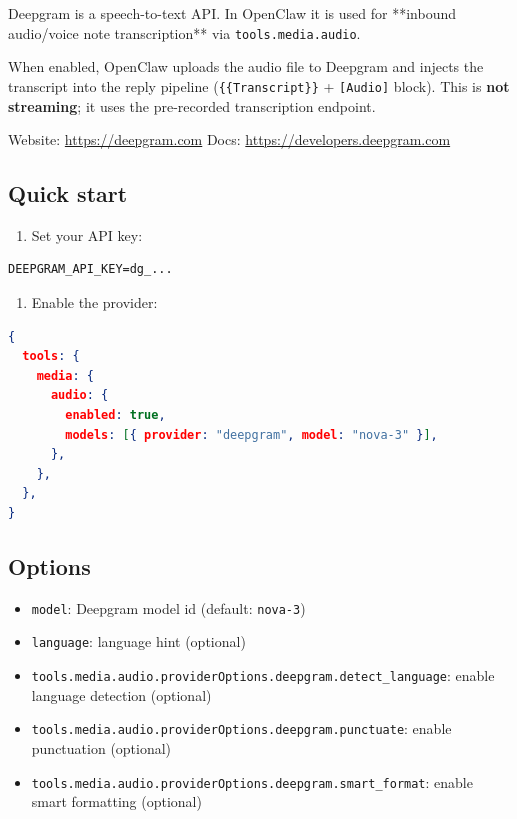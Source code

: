 Deepgram is a speech-to-text API. In OpenClaw it is used for **inbound audio/voice note
transcription** via \texttt{tools.media.audio}.

When enabled, OpenClaw uploads the audio file to Deepgram and injects the transcript
into the reply pipeline (\texttt{\{\{Transcript\}\}} + \texttt{[Audio]} block). This is \textbf{not streaming};
it uses the pre-recorded transcription endpoint.

Website: \href{https://deepgram.com}{https://deepgram.com}
Docs: \href{https://developers.deepgram.com}{https://developers.deepgram.com}

\subsection{Quick start}


\begin{enumerate}
  \item Set your API key:
\end{enumerate}


\begin{lstlisting}
DEEPGRAM_API_KEY=dg_...
\end{lstlisting}


\begin{enumerate}
  \item Enable the provider:
\end{enumerate}


\begin{lstlisting}[language=json]
{
  tools: {
    media: {
      audio: {
        enabled: true,
        models: [{ provider: "deepgram", model: "nova-3" }],
      },
    },
  },
}
\end{lstlisting}


\subsection{Options}


\begin{itemize}
  \item \texttt{model}: Deepgram model id (default: \texttt{nova-3})
  \item \texttt{language}: language hint (optional)
  \item \texttt{tools.media.audio.providerOptions.deepgram.detect\_language}: enable language detection (optional)
  \item \texttt{tools.media.audio.providerOptions.deepgram.punctuate}: enable punctuation (optional)
  \item \texttt{tools.media.audio.providerOptions.deepgram.smart\_format}: enable smart formatting (optional)
\end{itemize}


